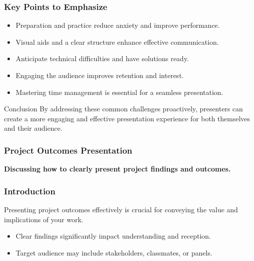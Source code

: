 \documentclass[aspectratio=169]{beamer}
\begin{document}
\begin{frame}[fragile]
    \frametitle{Key Points to Emphasize}
    \begin{itemize}
        \item Preparation and practice reduce anxiety and improve performance.
        \item Visual aids and a clear structure enhance effective communication.
        \item Anticipate technical difficulties and have solutions ready.
        \item Engaging the audience improves retention and interest.
        \item Mastering time management is essential for a seamless presentation.
    \end{itemize}

    \begin{block}{Conclusion}
        By addressing these common challenges proactively, presenters can create a more engaging and effective presentation experience for both themselves and their audience.
    \end{block}
\end{frame}

\begin{frame}[fragile]
    \frametitle{Project Outcomes Presentation}
    \textbf{Discussing how to clearly present project findings and outcomes.}
\end{frame}

\begin{frame}[fragile]
    \frametitle{Introduction}
    Presenting project outcomes effectively is crucial for conveying the value and implications of your work. 
    \begin{itemize}
        \item Clear findings significantly impact understanding and reception.
        \item Target audience may include stakeholders, classmates, or panels.
    \end{itemize}
\end{frame}
\end{document}
